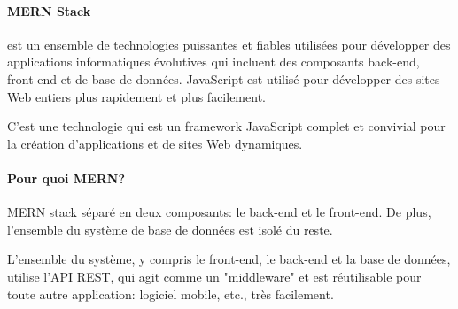     \paragraph{MERN Stack} est un ensemble de technologies puissantes et fiables utilisées pour développer des applications informatiques évolutives qui incluent des composants back-end, front-end et de base de données. JavaScript est utilisé pour développer des sites Web entiers plus rapidement et plus facilement.

    C'est une technologie qui est un framework JavaScript complet et convivial pour la création d'applications et de sites Web dynamiques.

    \paragraph{Pour quoi MERN?}MERN stack séparé en deux composants: le back-end et le front-end. De plus, l'ensemble du système de base de données est isolé du reste.

    L'ensemble du système, y compris le front-end, le back-end et la base de données, utilise l'API REST, qui agit comme un "middleware" et est réutilisable pour toute autre application: logiciel mobile, etc., très facilement.

